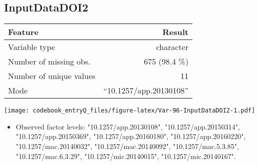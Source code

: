 \documentclass[]{article}
\providecommand{\tightlist}{%
  \setlength{\itemsep}{0pt}\setlength{\parskip}{0pt}}
\newcommand{\fullline}{\noindent\makebox[\linewidth]{\rule{\textwidth}{0.4pt}}}
\newcommand{\bminione}{\begin{minipage}{0.75 \textwidth}}
\newcommand{\bminitwo}{\begin{minipage}{0.25 \textwidth}}
\newcommand{\emini}{\end{minipage}}
\begin{document}
\fullline

\hypertarget{inputdatadoi2}{\subsection{InputDataDOI2}\label{inputdatadoi2}}

\bminione

\begin{longtable}[]{@{}lr@{}}
\toprule
\begin{minipage}[b]{0.34\columnwidth}\raggedright\strut
Feature\strut
\end{minipage} & \begin{minipage}[b]{0.34\columnwidth}\raggedleft\strut
Result\strut
\end{minipage}\tabularnewline
\midrule
\endhead
\begin{minipage}[t]{0.34\columnwidth}\raggedright\strut
Variable type\strut
\end{minipage} & \begin{minipage}[t]{0.34\columnwidth}\raggedleft\strut
character\strut
\end{minipage}\tabularnewline
\begin{minipage}[t]{0.34\columnwidth}\raggedright\strut
Number of missing obs.\strut
\end{minipage} & \begin{minipage}[t]{0.34\columnwidth}\raggedleft\strut
675 (98.4 \%)\strut
\end{minipage}\tabularnewline
\begin{minipage}[t]{0.34\columnwidth}\raggedright\strut
Number of unique values\strut
\end{minipage} & \begin{minipage}[t]{0.34\columnwidth}\raggedleft\strut
11\strut
\end{minipage}\tabularnewline
\begin{minipage}[t]{0.34\columnwidth}\raggedright\strut
Mode\strut
\end{minipage} & \begin{minipage}[t]{0.34\columnwidth}\raggedleft\strut
``10.1257/app.20130108''\strut
\end{minipage}\tabularnewline
\bottomrule
\end{longtable}

\emini
\bminitwo
\texttt{[image: codebook\_entryQ\_files/figure-latex/Var-96-InputDataDOI2-1.pdf]}
\emini

\begin{itemize}
\tightlist
\item
  Observed factor levels: "10.1257/app.20130108",
  "10.1257/app.20150314", "10.1257/app.20150369",
  "10.1257/app.20160180", "10.1257/app.20160220",
  "10.1257/mac.20140032", "10.1257/mac.20140092", "10.1257/mac.5.3.85",
  "10.1257/mac.6.3.29", "10.1257/mic.20140015", "10.1257/mic.20140167".
\end{itemize}
\end{document}
